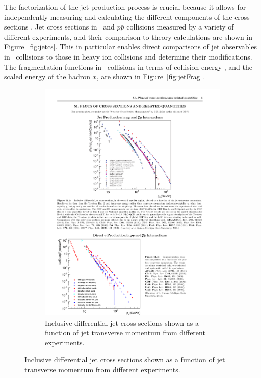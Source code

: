 The factorization of the jet production process is crucial because it allows for independently measuring and calculating the different components of the cross sections \cite{Majumder:2010qh}.
Jet cross sections in \pp\ and $p \bar{p}$ collisions measured by a variety of different experiments, and their comparison to theory calculations are shown in Figure~\ref{fig:jetcs}.
This in particular enables direct comparisons of jet observables in \pp\ collisions to those in heavy ion collisions and determine their modifications.
The fragmentation functions in \epm\ collisions in terms of collision energy \sqrts, and the scaled energy of the hadron $x$, are shown in Figure~\ref{fig:jetFrag}.

 \begin{figure}
\centering
\begin{subfigure}{.45\textwidth}
  \centering
  \includegraphics[width=\linewidth]{figures/theory/jetcs_pp}
  \caption{Inclusive differential jet cross sections shown as a function of jet transverse momentum from different experiments.
}
\end{subfigure}
\end{figure}
